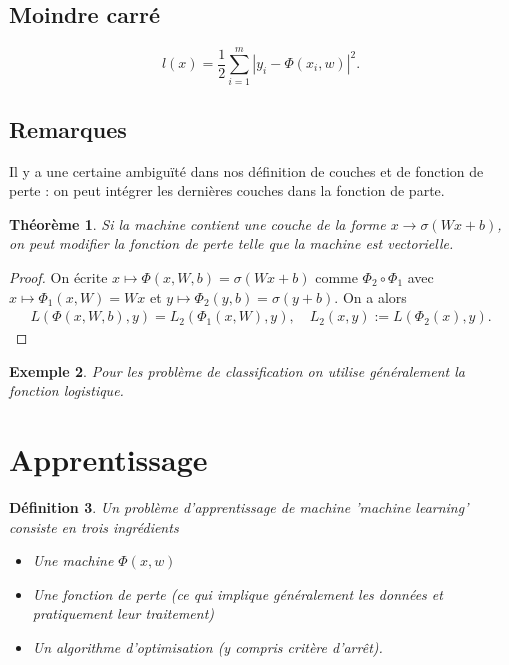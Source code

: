 \documentclass[11pt,a4paper]{article}
\newcommand{\abs}[1]{\left|#1\right|}
\newtheorem{theorem}{Théorème}[section]
\newtheorem{definition}[theorem]{Définition}
\newtheorem{example}[theorem]{Exemple}
\begin{document}
\subsection{Moindre carré}\label{subsec:}
%
%
\begin{equation}\label{equation:}
l(x)= \frac12\sum_{i=1}^m \abs{y_i-\Phi(x_i,w)}^2.
\end{equation}
%
%
\subsection{Remarques}\label{subsec:}
%
Il y a une certaine ambiguïté dans nos définition de couches et de fonction de perte : on peut intégrer les dernières couches dans la fonction de parte.
%
%
\begin{theorem}\label{theorem:}
Si la machine contient une couche de la forme $x\to \sigma(Wx+b)$, on peut modifier la fonction de perte telle que la machine est vectorielle.
\end{theorem}
%
%
\begin{proof}
On écrite $x\mapsto\Phi(x,W,b) = \sigma(Wx+b)$ comme $\Phi_2 \circ \Phi_1$ avec $x\mapsto \Phi_1(x,W) = Wx$ et $y\mapsto\Phi_2(y,b) = \sigma(y+b)$. On a alors
\begin{align*}
L(\Phi(x,W,b), y) = L_2(\Phi_1(x,W),y),\quad L_2 (x,y) := L(\Phi_2(x),y).
\end{align*}
\end{proof}
%
%
\begin{example}\label{example:}
Pour les problème de classification on utilise généralement la fonction logistique.
\end{example}
%
%
\section{Apprentissage}\label{sec:}
%
%
\begin{definition}\label{definition:}
Un problème d'apprentissage de machine 'machine learning' consiste en trois ingrédients
\begin{itemize}
\item Une machine $\Phi(x,w)$
\item Une fonction de perte (ce qui implique généralement les données et pratiquement leur traitement)
\item Un algorithme d'optimisation (y compris critère d'arrêt).
\end{itemize}
\end{definition}
%
%
\end{document}
